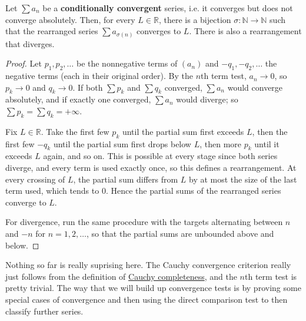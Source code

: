  \begin{theorem}
    \label{thm:riemann-rearrangement-theorem}
    Let $\sum a_n$ be a \textbf{conditionally convergent} series, i.e. it converges but does not converge absolutely. Then, for every $L \in \mathbb{R}$, there is a bijection $\sigma: \mathbb{N} \to \mathbb{N}$ such that the rearranged series $\sum a_{\sigma(n)}$ converges to $L$. There is also a rearrangement that diverges. 
  \end{theorem}
  \begin{proof}
    Let $p_1, p_2, \ldots$ be the nonnegative terms of $(a_n)$ and $-q_1, -q_2, \ldots$ the negative terms (each in their original order). By the $n$th term test, $a_n \to 0$, so $p_k \to 0$ and $q_k \to 0$. If both $\sum p_k$ and $\sum q_k$ converged, $\sum a_n$ would converge absolutely, and if exactly one converged, $\sum a_n$ would diverge; so $\sum p_k = \sum q_k = +\infty$. 

    Fix $L \in \mathbb{R}$. Take the first few $p_k$ until the partial sum first exceeds $L$, then the first few $-q_k$ until the partial sum first drops below $L$, then more $p_k$ until it exceeds $L$ again, and so on. This is possible at every stage since both series diverge, and every term is used exactly once, so this defines a rearrangement. At every crossing of $L$, the partial sum differs from $L$ by at most the size of the last term used, which tends to $0$. Hence the partial sums of the rearranged series converge to $L$. 

    For divergence, run the same procedure with the targets alternating between $n$ and $-n$ for $n = 1, 2, \ldots$, so that the partial sums are unbounded above and below. 
  \end{proof} 

  Nothing so far is really suprising here. The Cauchy convergence criterion really just follows from the definition of \hyperref[def:cauchy-completeness]{Cauchy completeness}, and the $n$th term test is pretty trivial. The way that we will build up convergence tests is by proving some special cases of convergence and then using the direct comparison test to then classify further series.     

